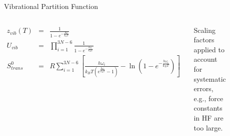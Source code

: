 \documentclass[aspectratio=169]{beamer}
\begin{document}
    \begin{frame}{Vibrational Partition Function}
        \begin{columns}

            \begin{eqnarray*}
                z_{vib}(T) & = & \frac{1}{1-e^{-\frac{h\omega}{k_BT}}}\\
                U_{vib} & = & \prod_{i=1}^{3N-6} \frac{1}{1-e^{-\frac{h\omega_i}{k_BT}}}\\
                S_{trans}^0 & = & R \sum_{i=1}^{3N-6} \left [ \frac{h\omega_i}{k_BT(e^{\frac{h\omega_i}{k_BT}}-1)} - \ln (1-e^{-\frac{h\omega_i}{k_BT}}) \right ]
            \end{eqnarray*}

            Scaling factors applied to account for systematic errors, e.g., force constants in HF are too large.


            \begin{figure}
                \centering
                \includegraphics[width=\linewidth]{lectures/figures/4_scaling_factors.png}
            \end{figure}
        \end{columns}

    \end{frame}
\end{document}
